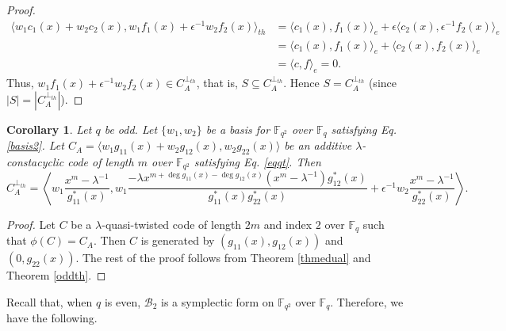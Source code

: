 \documentclass[12 pt]{extarticle}
\numberwithin{equation}{section}
\newtheorem{corollary}[theorem]{Corollary}
\theoremstyle{definition}
\begin{document}
\begin{proof}
\begin{equation*}
       \begin{split}
        \langle  w_1c_1(x)+w_2c_2(x),w_1f_1(x)+\epsilon^{-1}w_2f_2(x)\rangle_{th}&=\langle c_1(x),f_1(x)\rangle_e+\epsilon \langle c_2(x),\epsilon^{-1}f_2(x)\rangle_e\\
        &= \langle c_1(x),f_1(x)\rangle_e+\langle c_2(x),f_2(x)\rangle_e\\
        &=\langle c,f\rangle_e=0.
       \end{split}
   \end{equation*}
   Thus, $w_1f_1(x)+\epsilon^{-1}w_2f_2(x)\in C_A^{\perp_{th}}$, that is, $S\subseteq C_A^{\perp_{th}}$. Hence $S=C_A^{\perp_{th}}$ (since $|S|=|C_A^{\perp_{th}}|$).
\end{proof}


\begin{corollary}\label{thodddual}
    Let $q$ be odd. Let $\{w_1,w_2\}$ be a basis for $\mathbb{F}_{q^2}$ over $\mathbb{F}_q$ satisfying Eq. \ref{basis2}. Let $C_A=\langle w_1g_{11}(x)+w_2g_{12}(x),w_2g_{22}(x)\rangle$ be an additive $\lambda$-constacyclic code of length $m$ over $\mathbb{F}_{q^2}$ satisfying Eq. \ref{eqqt}. Then
    $$C_A^{\perp_{th}}=\left \langle w_1\frac{x^m-\lambda^{-1}}{g^*_{11}(x)}, w_1\frac{-\lambda x^{m+\deg g_{11}(x)-\deg g_{12}(x)}(x^m-\lambda^{-1})g^*_{12}(x)}{g^*_{11}(x)g^*_{22}(x)}+\epsilon^{-1}w_2\frac{x^m-\lambda^{-1}}{g^*_{22}(x)}\right \rangle.$$ 
\end{corollary}
\begin{proof}
    Let $C$ be a $\lambda$-quasi-twisted code of length $2m$ and index $2$ over $\mathbb{F}_q$ such that $\phi(C)=C_A$. Then $C$ is generated by $(g_{11}(x),g_{12}(x))$ and $(0,g_{22}(x))$. The rest of the proof follows from Theorem \ref{thmedual} and Theorem \ref{oddth}.
\end{proof}




Recall that, when $q$ is even, $\mathcal{B}_2$ is a symplectic form on $\mathbb{F}_{q^2}$ over $\mathbb{F}_q$. Therefore, we have the following.
\end{document}
